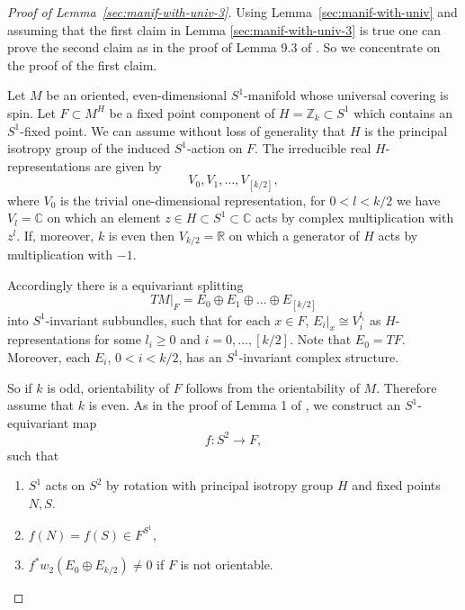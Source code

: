 \documentclass[a4paper, 11pt]{amsart}
\theoremstyle{definition}
\theoremstyle{remark}
\numberwithin{equation}{section}
\begin{document}
\begin{proof}[Proof of Lemma~\ref{sec:manif-with-univ-3}]
Using Lemma~\ref{sec:manif-with-univ} and assuming that the first claim in Lemma \ref{sec:manif-with-univ-3} is true one can prove the second claim as in the proof of Lemma 9.3 of \cite{MR954493}.
So we concentrate on the proof of the first claim.

  Let \(M\) be an oriented, even-dimensional \(S^1\)-manifold whose universal covering is spin.
  Let \(F\subset M^H\) be a fixed point component of \(H=\mathbb{Z}_k\subset S^1\) which contains an \(S^1\)-fixed point.
  We can assume without loss of generality that \(H\) is the principal isotropy group of the induced \(S^1\)-action on \(F\).
The irreducible real \(H\)-representations are given by
\[V_0,V_1,\dots,V_{[k/2]},\]
where \(V_0\) is the trivial one-dimensional representation, for \(0<l<k/2\) we have \(V_l=\mathbb{C}\) on which an element \(z\in H\subset S^1\subset \mathbb{C}\) acts by complex multiplication with \(z^l\).
If, moreover, \(k\) is even then \(V_{k/2}=\mathbb{R}\) on which a generator of \(H\) acts by multiplication with \(-1\).

Accordingly there is a equivariant splitting
\[TM|_F=E_0\oplus E_1\oplus\dots\oplus E_{[k/2]}\]
into \(S^1\)-invariant subbundles, such that for each \(x\in F\), \(E_i|_x\cong V_i^{l_i}\) as \(H\)-represen\-ta\-tions for some \(l_i\geq 0\) and \(i=0,\dots,[k/2]\).
Note that \(E_0=TF\). Moreover, each \(E_i\), \(0<i<k/2\), has an \(S^1\)-invariant complex structure.

So if \(k\) is odd, orientability of \(F\) follows from the orientability of \(M\).
Therefore assume that \(k\) is even.
As in the proof of Lemma 1 of \cite{MR1979364}, we construct an \(S^1\)-equivariant map
\[f:S^2\rightarrow F,\]
such that
\begin{enumerate}
\item \(S^1\) acts on \(S^2\) by rotation with principal isotropy group \(H\) and fixed points \(N,S\).
\item \(f(N)=f(S)\in F^{S^1}\),
\item \(f^*w_2(E_0\oplus E_{k/2})\neq 0\) if \(F\) is not orientable.
\end{enumerate}


\end{proof}
\end{document}
